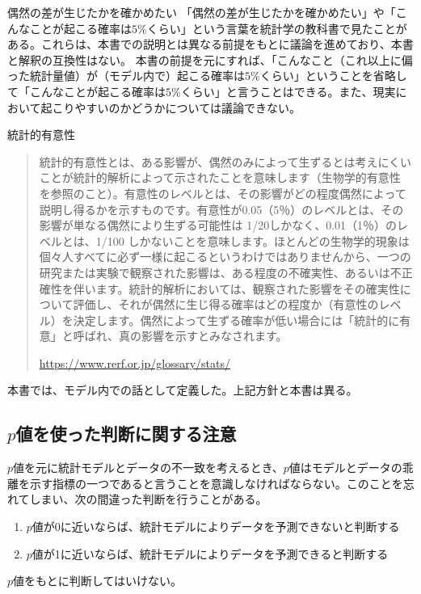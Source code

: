 \begin{SMbox}{偶然の差が生じたかを確かめたい}
 「偶然の差が生じたかを確かめたい」や「こんなことが起こる確率は$5\%$くらい」という言葉を統計学の教科書で見たことがある。これらは、本書での説明とは異なる前提をもとに議論を進めており、本書と解釈の互換性はない。
 本書の前提を元にすれば、「こんなこと（これ以上に偏った統計量値）が（モデル内で）起こる確率は$5\%$くらい」ということを省略して「こんなことが起こる確率は$5\%$くらい」と言うことはできる。また、現実において起こりやすいのかどうかについては議論できない。


    
\end{SMbox}


\begin{SMbox}{統計的有意性}
 \begin{quote}
  統計的有意性とは、ある影響が、偶然のみによって生ずるとは考えにくいことが統計的解析によって示されたことを意味します（生物学的有意性 を参照のこと）。有意性のレベルとは、その影響がどの程度偶然によって説明し得るかを示すものです。有意性が0.05（5％）のレベルとは、その影響が単なる偶然により生ずる可能性は 1/20しかなく、0.01（1％）のレベルとは、1/100 しかないことを意味します。ほとんどの生物学的現象は個々人すべてに必ず一様に起こるというわけではありませんから、一つの研究または実験で観察された影響は、ある程度の不確実性、あるいは不正確性を伴います。統計的解析においては、観察された影響をその確実性について評価し、それが偶然に生じ得る確率はどの程度か（有意性のレベル）を決定します。偶然によって生ずる確率が低い場合には「統計的に有意」と呼ばれ、真の影響を示すとみなされます。

  \url{https://www.rerf.or.jp/glossary/stats/}
 \end{quote}
 本書では、モデル内での話として定義した。上記方針と本書は異る。
\end{SMbox}


\subsection{$p$値を使った判断に関する注意}
$p$値を元に統計モデルとデータの不一致を考えるとき、$p$値はモデルとデータの乖離を示す指標の一つであると言うことを意識しなければならない。このことを忘れてしまい、次の間違った判断を行うことがある。
\begin{enumerate}
    \item $p$値が0に近いならば、統計モデルによりデータを予測できないと判断する
    \item $p$値が1に近いならば、統計モデルによりデータを予測できると判断する
\end{enumerate}
$p$値をもとに判断してはいけない。

